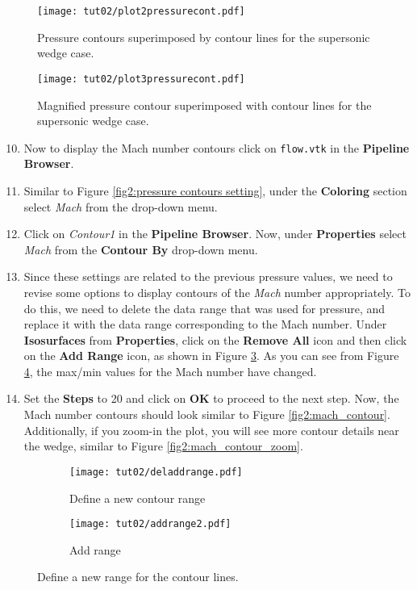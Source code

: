 \begin{figure}[ht]
    \centering
    \texttt{[image: tut02/plot2pressurecont.pdf]}
    \caption{Pressure contours superimposed by contour lines for the supersonic wedge case.}
    \label{fig2:pressure_contour_lines}
\end{figure}
\begin{figure}[H]
    \centering
    \texttt{[image: tut02/plot3pressurecont.pdf]}
    \caption{Magnified pressure contour superimposed with contour lines for the supersonic wedge case.}
    \label{fig2:pressure_contour_lines_zoom}
\end{figure}
\begin{enumerate}[label=\arabic*)]
	\setcounter{enumi}{9}
	\item Now to display the Mach number contours click on \texttt{flow.vtk} in the \textbf{Pipeline Browser}.
	\item Similar to Figure \ref{fig2:pressure contours setting}, under the \textbf{Coloring} section select \textit{Mach} from the drop-down menu.
	\item Click on \textit{Contour1} in the \textbf{Pipeline Browser}. Now, under \textbf{Properties} select \textit{Mach} from the \textbf{Contour By} drop-down menu.
	\item Since these settings are related to the previous pressure values, we need to revise some options to display contours of the \textit{Mach} number appropriately. To do this, we need to delete the data range that was used for pressure, and replace it with the data range corresponding to the Mach number. Under \textbf{Isosurfaces} from \textbf{Properties}, click on the \textbf{Remove All} icon and then click on the \textbf{Add Range} icon, as shown in Figure \ref{fig2:contourby2 a}. As you can see from Figure \ref{fig2:contourby2 b}, the max/min values for the Mach number have changed.
	\item Set the \textbf{Steps} to 20 and click on \textbf{OK} to proceed to the next step. Now, the Mach number contours should look similar to Figure \ref{fig2:mach_contour}. Additionally, if you zoom-in the plot, you will see more contour details near the wedge, similar to Figure \ref{fig2:mach_contour_zoom}.
\end{enumerate}
\begin{figure}[ht]
    \centering
     \begin{subfigure}[b]{.4\textwidth}
         \centering
         \texttt{[image: tut02/deladdrange.pdf]}
         \caption{Define a new contour range}
         \label{fig2:contourby2 a}
     \end{subfigure}
     \hfill
     \begin{subfigure}[b]{.4\textwidth}
         \centering
         \texttt{[image: tut02/addrange2.pdf]}
         \caption{Add range}
         \label{fig2:contourby2 b}
     \end{subfigure}     
    \caption{Define a new range for the contour lines.}
    \label{fig2:contourby2}
\end{figure}
